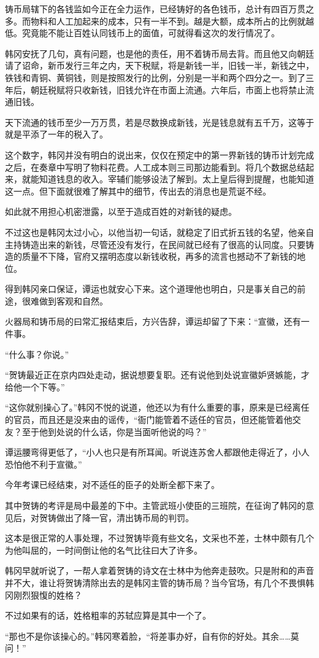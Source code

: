 铸币局辖下的各钱监如今正在全力运作，已经铸好的各色钱币，总计有四百万贯之多。而物料和人工加起来的成本，只有一半不到。越是大额，成本所占的比例就越低。究竟能不能让百姓认同钱币上的面值，可就得看这次的发行情况了。

韩冈安抚了几句，真有问题，也是他的责任，用不着铸币局去背。而且他又向朝廷请了诏命，新币发行三年之内，天下税赋，将是新钱一半，旧钱一半，新钱之中，铁钱和青铜、黄铜钱，则是按照发行的比例，分别是一半和两个四分之一。到了三年后，朝廷税赋将只收新钱，旧钱允许在市面上流通。六年后，市面上也将禁止流通旧钱。

天下流通的钱币至少一万万贯，若是尽数换成新钱，光是钱息就有五千万，这等于就是平添了一年的税入了。

这个数字，韩冈并没有明白的说出来，仅仅在预定中的第一界新钱的铸币计划完成之后，在奏章中写明了物料花费。人工成本则三司那边能看到。将几个数据总结起来，就能知道钱息的收入。宰辅们能够设法了解到。太上皇后得到提醒，也能知道这一点。但下面就很难了解其中的细节，传出去的消息也是荒诞不经。

如此就不用担心机密泄露，以至于造成百姓的对新钱的疑虑。

不过这也是韩冈太过小心，以他当初一句话，就稳定了旧式折五钱的名望，他亲自主持铸造出来的新钱，尽管还没有发行，在民间就已经有了很高的认同度。只要铸造的质量不下降，官府又摆明态度以新钱收税，再多的流言也撼动不了新钱的地位。

得到韩冈亲口保证，谭运也就安心下来。这个道理他也明白，只是事关自己的前途，很难做到客观和自然。

火器局和铸币局的曰常汇报结束后，方兴告辞，谭运却留了下来：“宣徽，还有一件事。

“什么事？你说。”

“贺铸最近正在京内四处走动，据说想要复职。还有说他到处说宣徽妒贤嫉能，才给他一个下等。”

“这你就别操心了。”韩冈不悦的说道，他还以为有什么重要的事，原来是已经离任的官员，而且还是没来由的谣传，“衙门能管着不适任的官员，但还能管着他交友？至于他到处说的什么话，你是当面听他说的吗？”

谭运腰弯得更低了，“小人也只是有所耳闻。听说连苏舍人都跟他走得近了，小人恐怕他不利于宣徽。”

今年考课已经结束，对不适任的臣子的处断全都下来了。

其中贺铸的考评是局中最差的下中。主管武班小使臣的三班院，在征询了韩冈的意见后，对贺铸做出了降一官，清出铸币局的判罚。

这本是很正常的人事处理，不过贺铸毕竟有些文名，文采也不差，士林中颇有几个为他叫屈的，一时间倒让他的名气比往曰大了许多。

韩冈早就听说了，一帮人拿着贺铸的诗文在士林中为他奔走鼓吹。只是附和的声音并不大，谁让将贺铸清除出去的是韩冈主管的铸币局？当今官场，有几个不畏惧韩冈刚烈狠愎的姓格？

不过如果有的话，姓格粗率的苏轼应算是其中一个了。

“那也不是你该操心的。”韩冈寒着脸，“将差事办好，自有你的好处。其余……莫问！”
